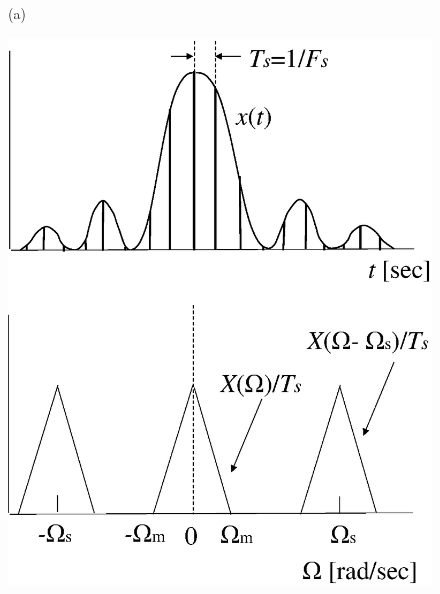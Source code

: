 \begin{figure}[b]
\begin{center}
\begin{minipage}{.35\textwidth}
\begin{center}
(a)
\end{center}
\end{minipage}
\begin{minipage}{.35\textwidth}
\begin{center}
\includegraphics[width=.98\textwidth]{fig/zu-4-19-b.eps}


\end{center}
\end{minipage}
\end{center}
\end{figure}
